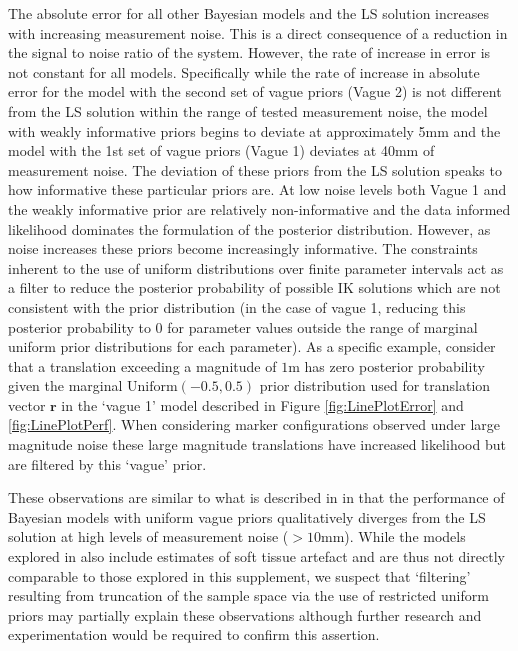 \documentclass{article}
\begin{document}
The absolute error for all other Bayesian models and the LS solution increases with increasing measurement noise.  This is a direct consequence of a reduction in the signal to noise ratio of the system.  However, the rate of increase in error is not constant for all models. Specifically while the rate of increase in absolute error for the model with the second set of vague priors (Vague 2) is not different from the LS solution within the range of tested measurement noise, the model with weakly informative priors begins to deviate at approximately 5\si{\milli\meter} and the model with the 1st set of vague priors (Vague 1) deviates at 40\si{\milli\meter} of measurement noise.  The deviation of these priors from the LS solution speaks to how informative these particular priors are.  At low noise levels both Vague 1 and the weakly informative prior are relatively non-informative and the data informed likelihood dominates the formulation of the posterior distribution.  However, as noise increases these priors become increasingly informative.  The constraints inherent to the use of uniform distributions over finite parameter intervals act as a filter to reduce the posterior probability of possible IK solutions which are not consistent with the prior distribution (in the case of vague 1, reducing this posterior probability to 0 for parameter values outside the range of marginal uniform prior distributions for each parameter). As a specific example, consider that a translation exceeding a magnitude of $1$\si{\meter} has zero posterior probability given the marginal $\text{Uniform}(\bm{-0.5}, \bm{0.5})$ prior distribution used for translation vector $\bm{r}$ in the `vague 1' model described in Figure \ref{fig:LinePlotError} and \ref{fig:LinePlotPerf}. When considering marker configurations observed under large magnitude noise these large magnitude translations have increased likelihood but are filtered by this `vague' prior.  

These observations are similar to what is described in \cite{serrien_bayesian_2020} in that the performance of Bayesian models with uniform vague priors qualitatively diverges from the LS solution at high levels of measurement noise ($>10\si{\milli\meter}$).  While the models explored in \cite{serrien_bayesian_2020} also include estimates of soft tissue artefact and are thus not directly comparable to those explored in this supplement, we suspect that `filtering' resulting from truncation of the sample space via the use of restricted uniform priors may partially explain these observations although further research and experimentation would be required to confirm this assertion.
\end{document}
